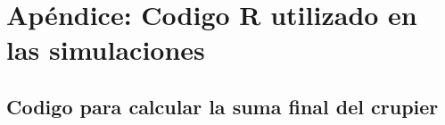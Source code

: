\documentclass[12pt,a4paper,]{book}
\title{}
\author{Nombre Completo Autor}
\date{18/11/2021}
\def\ifdoblecara{} %
\def\ifprincipal{} %
\let\ifprincipal\undefined %
\numberwithin{dummy}{section}
\theoremstyle{ocrenumbox}
\theoremstyle{blacknumex}
\theoremstyle{blacknumbox}
\theoremstyle{ocrenum}
\theoremstyle{ocrenum}
\begin{document}




\raggedbottom

\ifdefined\ifprincipal
\else
\setlength{\parindent}{1em}
\pagestyle{fancy}
\setcounter{tocdepth}{4}
\tableofcontents

\fi

\ifdefined\ifdoblecara
\fancyhead{}{}
\fancyhead[LE,RO]{\scriptsize\rightmark}
\fancyfoot[LO,RE]{\scriptsize\slshape \leftmark}
\fancyfoot[C]{}
\fancyfoot[LE,RO]{\footnotesize\thepage}
\else
\fancyhead{}{}
\fancyhead[RO]{\scriptsize\rightmark}
\fancyfoot[LO]{\scriptsize\slshape \leftmark}
\fancyfoot[C]{}
\fancyfoot[RO]{\footnotesize\thepage}
\fi

\renewcommand{\headrulewidth}{0.4pt}
\renewcommand{\footrulewidth}{0.4pt}

\hypertarget{apuxe9ndice-codigo-r-utilizado-en-las-simulaciones}{%
\chapter{Apéndice: Codigo R utilizado en las
simulaciones}\label{apuxe9ndice-codigo-r-utilizado-en-las-simulaciones}}

\hypertarget{codigo-para-calcular-la-suma-final-del-crupier}{%
\section{Codigo para calcular la suma final del
crupier}\label{codigo-para-calcular-la-suma-final-del-crupier}}
\end{document}
